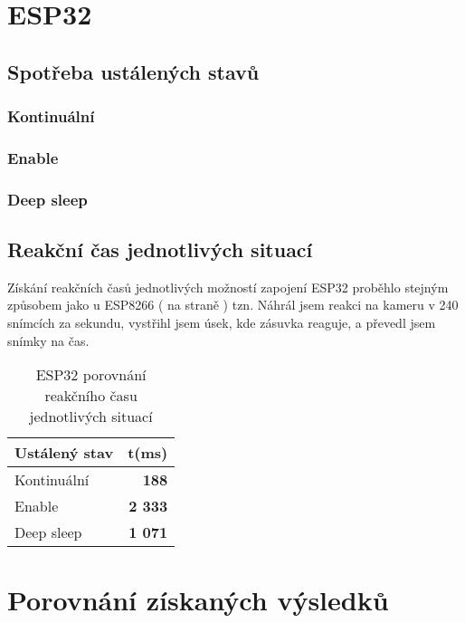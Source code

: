 \documentclass[a4paper, 12pt]{report}
\begin{document}
		\section{ESP32}

			\subsection{Spotřeba ustálených stavů}

				\subsubsection{Kontinuální}

				\subsubsection{Enable}

				\subsubsection{Deep sleep}

			\subsection{Reakční čas jednotlivých situací}
				Získání reakčních časů jednotlivých možností zapojení ESP32 proběhlo stejným způsobem jako u ESP8266 ( na straně \pageref{sonyvegaspostup}) tzn. Náhrál jsem reakci na kameru v 240 snímcích za sekundu, vystřihl jsem úsek, kde zásuvka reaguje, a převedl jsem snímky na čas.

				\begin{table}[h]
					\centering
					\caption{ESP32 porovnání reakčního času jednotlivých situací}
					\begin{tabular}{||l|r||}
						\hline
						Ustálený stav & t(ms) \\
						\hline
						Kontinuální & {\bf 188} \\
						Enable & {\bf 2 333} \\
						Deep sleep & {\bf 1 071} \\
						\hline
					\end{tabular}
					\label{ESP32 klidové režimy čas}
				\end{table}

		\section{Porovnání získaných výsledků}
\end{document}
